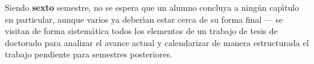 \documentclass[10 pt]{article}
\begin{document}


Siendo {\bf sexto} semestre, no se espera que un alumno concluya a
ning\'{u}n cap\'{\i}tulo en particular, aunque varios ya deber\'{\i}an
estar cerca de su forma final --- se visitan de forma sistem\'{a}tica
todos los elementos de un trabajo de tesis de doctorado para analizar
el avance actual y calendarizar de manera estructurada el trabajo
pendiente para semestres posteriores.


\end{document}
